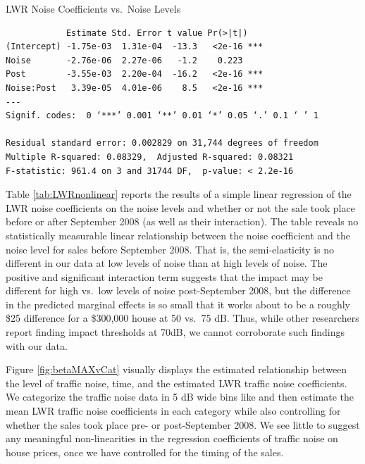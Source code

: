 \documentclass{article}\usepackage{graphicx, color}
\begin{document}
\begin{table}
\caption{LWR Noise Coefficients vs.\ Noise Levels}\label{tab:LWRnonlinear}
\begin{verbatim}
            Estimate Std. Error t value Pr(>|t|)    
(Intercept) -1.75e-03  1.31e-04  -13.3   <2e-16 ***
Noise       -2.76e-06  2.27e-06   -1.2    0.223    
Post        -3.55e-03  2.20e-04  -16.2   <2e-16 ***
Noise:Post   3.39e-05  4.01e-06    8.5   <2e-16 ***
---
Signif. codes:  0 ‘***’ 0.001 ‘**’ 0.01 ‘*’ 0.05 ‘.’ 0.1 ‘ ’ 1 

Residual standard error: 0.002829 on 31,744 degrees of freedom
Multiple R-squared: 0.08329,  Adjusted R-squared: 0.08321 
F-statistic: 961.4 on 3 and 31744 DF,  p-value: < 2.2e-16 
\end{verbatim}
\end{table}

Table \ref{tab:LWRnonlinear} reports the results of a simple linear regression of the LWR noise coefficients on the noise levels and whether or not the sale took place before or after September 2008 (as well as their interaction). The table reveals no statistically measurable linear relationship between the noise coefficient and the noise level for sales before September 2008. That is, the semi-elasticity is no different in our data at low levels of noise than at high levels of noise. The positive and significant interaction term suggests that the impact may be different for high vs.\ low levels of noise post-September 2008, but the difference in the predicted marginal effects is so small that it works about to be a roughly \$25 difference for a \$300,000 house at 50 vs.\ 75 dB. Thus, while other researchers report finding impact thresholds at 70dB, we cannot corroborate such findings with our data.

Figure \ref{fig:betaMAXvCat} visually displays the estimated relationship between the level of traffic noise, time, and the estimated LWR traffic noise coefficients. We categorize the traffic noise data in 5 dB wide bins like \citet{Theebe2004a} and then estimate the mean LWR traffic noise coefficients in each category while also controlling for whether the sales took place pre- or post-September 2008. We see little to suggest any meaningful non-linearities in the regression coefficients of traffic noise on house prices, once we have controlled for the timing of the sales.
\end{document}
